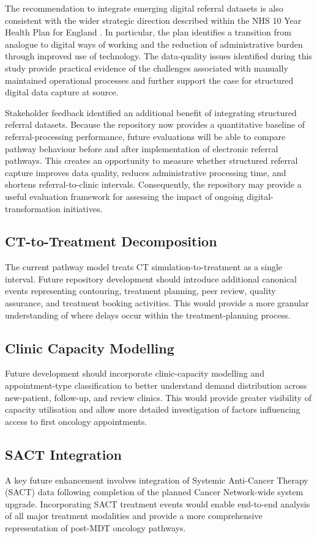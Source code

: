 The recommendation to integrate emerging digital referral datasets is also consistent with the wider strategic direction described within the NHS 10 Year Health Plan for England \citep{DHSC2025}. In particular, the plan identifies a transition from analogue to digital ways of working and the reduction of administrative burden through improved use of technology. The data-quality issues identified during this study provide practical evidence of the challenges associated with manually maintained operational processes and further support the case for structured digital data capture at source.

Stakeholder feedback identified an additional benefit of integrating structured referral datasets. Because the repository now provides a quantitative baseline of referral-processing performance, future evaluations will be able to compare pathway behaviour before and after implementation of electronic referral pathways. This creates an opportunity to measure whether structured referral capture improves data quality, reduces administrative processing time, and shortens referral-to-clinic intervals. Consequently, the repository may provide a useful evaluation framework for assessing the impact of ongoing digital-transformation initiatives.

\subsection{CT-to-Treatment Decomposition}
The current pathway model treats CT simulation-to-treatment as a single interval. Future repository development should introduce additional canonical events representing contouring, treatment planning, peer review, quality assurance, and treatment booking activities. This would provide a more granular understanding of where delays occur within the treatment-planning process.

\subsection{Clinic Capacity Modelling}
Future development should incorporate clinic-capacity modelling and appointment-type classification to better understand demand distribution across new-patient, follow-up, and review clinics. This would provide greater visibility of capacity utilisation and allow more detailed investigation of factors influencing access to first oncology appointments.

\subsection{SACT Integration}
A key future enhancement involves integration of Systemic Anti-Cancer Therapy (SACT) data following completion of the planned Cancer Network-wide system upgrade. Incorporating SACT treatment events would enable end-to-end analysis of all major treatment modalities and provide a more comprehensive representation of post-MDT oncology pathways.


